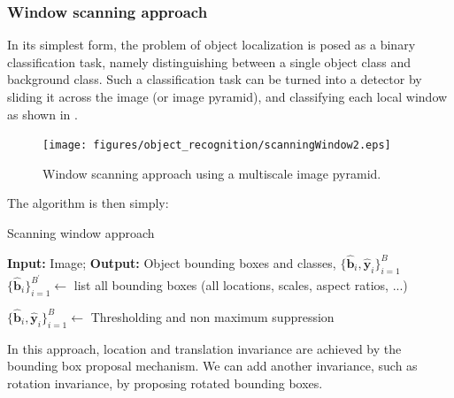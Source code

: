 \subsubsection{Window scanning approach}
In its simplest form, the problem of object localization is posed as a binary classification task, namely distinguishing between a single object class and background class. Such a classification task can be turned into a detector by sliding it across the image (or image pyramid), and classifying each local window as shown in \fig{\ref{fig:scanningWindow2}}.

\begin{figure}[h]
\centerline{
\texttt{[image: figures/object\_recognition/scanningWindow2.eps]}
}
\caption{Window scanning approach using a multiscale image pyramid.}
\label{fig:scanningWindow2}
\end{figure}

The algorithm is then simply:
\begin{algorithm}[h]
\SetAlgoVlined
\DontPrintSemicolon
{}
\caption{Scanning window approach}
\faketablecaption{}
\label{alg:scanning_window}
{\bf Input:} Image;
{\bf Output:} Object bounding boxes and classes, $\{\hat{\mathbf{b}}_i, \hat{\mathbf{y}}_i\}_{i=1}^B$\;
$\{\hat{\mathbf{b}}_i\}_{i=1}^{B^{\prime}} \leftarrow$ list all bounding boxes (all locations, scales, aspect ratios, ...)\;

$\{\hat{\mathbf{b}}_i, \hat{\mathbf{y}}_i\}_{i=1}^B \leftarrow$ Thresholding and non maximum suppression\;
\label{alg:object_localization}
\end{algorithm}

In this approach, location and translation invariance are achieved by the bounding box proposal mechanism. We can add another invariance, such as rotation invariance, by proposing rotated bounding boxes. 

